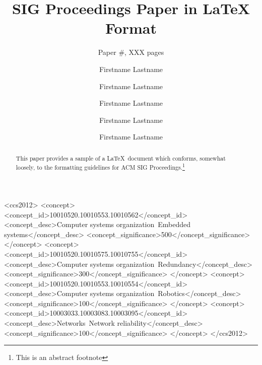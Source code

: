 \documentclass[10pt,sigconf,anonymous]{acmart}
\begin{document}
\title{SIG Proceedings Paper in LaTeX Format}
\subtitle{Paper \#, XXX pages}

\author{Firstname Lastname}

\author{Firstname Lastname}

\author{Firstname Lastname}

\author{Firstname Lastname}

\author{Firstname Lastname}

\renewcommand{\shortauthors}{F. Lastname et al.}

\begin{abstract}
  This paper provides a sample of a \LaTeX\ document which conforms,
  somewhat loosely, to the formatting guidelines for
  ACM SIG Proceedings.\footnote{This is an abstract footnote}
\end{abstract}

%
%
\begin{CCSXML}
  <ccs2012>
  <concept>
  <concept_id>10010520.10010553.10010562</concept_id>
  <concept_desc>Computer systems organization~Embedded systems</concept_desc>
  <concept_significance>500</concept_significance>
  </concept>
  <concept>
  <concept_id>10010520.10010575.10010755</concept_id>
  <concept_desc>Computer systems organization~Redundancy</concept_desc>
  <concept_significance>300</concept_significance>
  </concept>
  <concept>
  <concept_id>10010520.10010553.10010554</concept_id>
  <concept_desc>Computer systems organization~Robotics</concept_desc>
  <concept_significance>100</concept_significance>
  </concept>
  <concept>
  <concept_id>10003033.10003083.10003095</concept_id>
  <concept_desc>Networks~Network reliability</concept_desc>
  <concept_significance>100</concept_significance>
  </concept>
  </ccs2012>
\end{CCSXML}
\end{document}
